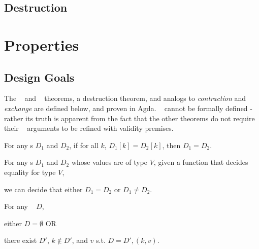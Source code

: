\subsection{Destruction}



\section{Properties}
\label{sec:DD:props}

\subsection{Design Goals}

The \SemInj~ and \EqDec~ theorems, a destruction theorem, and analogs to \emph{contraction} and
\emph{exchange} are defined below, and proven in Agda. \SemTot~ cannot be formally defined - rather
its truth is apparent from the fact that the other theorems do not require their \dd~ arguments to
be refined with validity premises.

\begin{proposition}[\SemTot]

\breakAndIndent
%

\end{proposition}

\begin{theorem}[\SemInj]
\label{thm:SemInj}

\breakAndIndent
%
For any {\dd}s $D_1$ and $D_2$,
%
if for all $k$, $D_1[k] = D_2[k]$,
%
then $D_1 = D_2$.

\end{theorem}

\begin{theorem}[\EqDec]
\label{thm:EqDec}

\breakAndIndent
%
For any {\dd}s $D_1$ and $D_2$ whose values are of type $V$,
%
given a function that decides equality for type $V$,
%

\justIndent
%
we can decide that either $D_1 = D_2$ or $D_1 \ne D_2$.

\end{theorem}

\begin{theorem}[\EzDstr]
\label{thm:EzDstr}

\breakAndIndent
%
For any \dd~ $D$,

\justIndent \quad
%
either $D = \emptyset$ OR

\justIndent \quad
%
there exist $D'$, $k \notin D'$, and $v$
%
s.t. $D = D' , (k, v)$.

\end{theorem}

